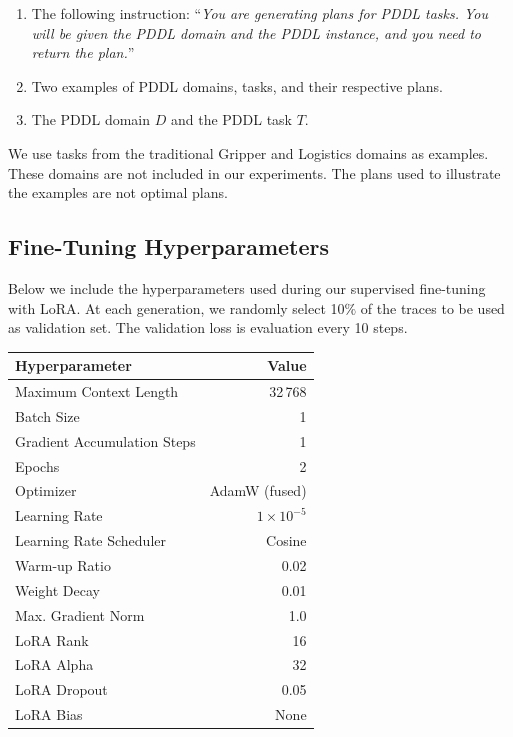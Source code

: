 \documentclass{article}
\begin{document}
\begin{enumerate}
\item The following instruction: ``\textit{You are generating plans for PDDL tasks. You
  will be given the PDDL domain and the PDDL instance, and you need to return
  the plan.}''
\item Two examples of PDDL domains, tasks, and their respective plans.
\item The PDDL domain $D$ and the PDDL task $T$.
\end{enumerate}
We use tasks from the traditional Gripper and Logistics domains as
examples. These domains are not included in our experiments. The plans used
to illustrate the examples are not optimal plans.



\subsection{Fine-Tuning Hyperparameters}
\label{sec:hyperparameters}

Below we include the hyperparameters used during our supervised fine-tuning with
LoRA. At each generation, we randomly select 10$\%$ of the traces to be used as
validation set. The validation loss is evaluation every 10 steps.

\begin{center}
\begin{tabular}{lr}
\toprule
\textbf{Hyperparameter}      & \textbf{Value}     \\ \midrule
 Maximum Context Length      & 32\,768            \\
 Batch Size                  & 1                  \\
 Gradient Accumulation Steps & 1                  \\
 Epochs                      & 2                  \\
 Optimizer                   & AdamW (fused)      \\
 Learning Rate               & $1 \times 10^{-5}$ \\
 Learning Rate Scheduler     & Cosine             \\
 Warm-up Ratio                & 0.02               \\
 Weight Decay                & 0.01               \\
 Max. Gradient Norm          & 1.0                \\
 LoRA Rank                   & 16                 \\
 LoRA Alpha                  & 32                 \\
 LoRA Dropout                & 0.05               \\
 LoRA Bias                    & None               \\
\bottomrule
\end{tabular}
\end{center}
\end{document}
